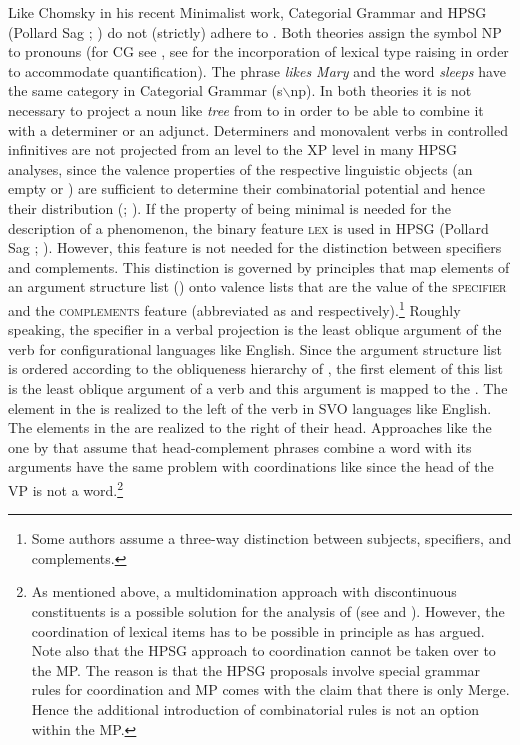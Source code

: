 \largerpage
Like Chomsky in his recent Minimalist work, Categorial Grammar \citep{Ajdukiewicz35a-u} and HPSG
(Pollard \biband Sag \citeyear{ps}; \citeyear[--40]{ps2}) do not (strictly) adhere to
\xbart. Both theories assign the symbol NP to pronouns (for CG see , see
 for the incorporation of lexical type raising in order to accommodate
quantification). The phrase \emph{likes Mary} and the word \emph{sleeps} have the same category in Categorial Grammar (s$\backslash$np). In both theories it is not
necessary to project a noun like \emph{tree} from \nnull to \nbar in order to be able to combine it
with a determiner or an adjunct. Determiners and monovalent verbs in controlled infinitives are
not projected from an \xzero level to the XP level in many HPSG analyses, since the valence
properties of the respective linguistic objects (an empty \subcat or \compsl) are sufficient to
determine their combinatorial potential and hence their distribution (\citealp{Mueller96a};
\citealp{Mueller99a}). If the property of being minimal is needed for the description of a 
phenomenon, the binary feature \textsc{lex} is used in HPSG (Pollard \biband Sag \citeyear[]{ps};
\citeyear[]{ps2}). However, this feature is not needed for the distinction between
specifiers and complements. This distinction is governed by principles that map elements of an
argument structure list (\argst) onto valence lists that are the value of the \textsc{specifier} and
the \textsc{complements} feature (abbreviated as \spr and \comps respectively).\footnote{%
  Some authors assume a three-way distinction between subjects, specifiers, and complements.
} Roughly speaking, the specifier in a verbal projection is the least oblique argument of the verb for
configurational languages like English. Since the argument structure list is ordered according to
the obliqueness hierarchy of \citet{KC77a}, the first element of this list is the least oblique
argument of a verb and this argument is mapped to the \sprl. The element in the \sprl is realized to the left of the
verb in SVO languages like English. The elements in the \compsl are realized to the right of their
head. Approaches like the one by \citet[, 364]{GSag2000a-u} that assume that
head-complement phrases combine a word with its arguments have the same problem with coordinations
like  since the head of the VP is not a word.\footnote{%
  As mentioned above, a multidomination approach with discontinuous constituents is a possible
  solution for the analysis of   (see
  \citealp{Crysmann2000a} and \citealp{BS2004a}). However, the coordination of lexical items has to be possible in
  principle as \citet{Abeille2006a} has argued. Note also that the HPSG approach to coordination
  cannot be taken over to the MP. The reason is that the HPSG proposals involve special grammar
  rules for coordination and MP comes with the claim that there is only Merge. Hence the additional
  introduction of combinatorial rules is not an option within the MP.
} 
